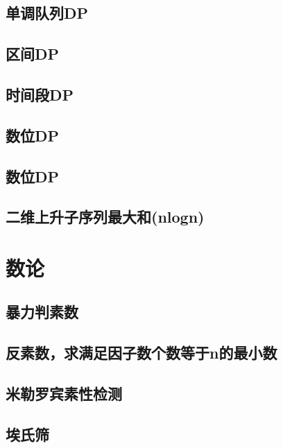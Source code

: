 \section{单调队列DP}
\raggedbottom
\hrulefill
\section{区间DP}
\raggedbottom
\hrulefill
\section{时间段DP}
\raggedbottom
\hrulefill
\section{数位DP}
\raggedbottom
\hrulefill
\section{数位DP}
\raggedbottom
\hrulefill
\section{二维上升子序列最大和(nlogn)}
\raggedbottom
\hrulefill

\chapter{数论}
\section{暴力判素数}
\raggedbottom
\hrulefill
\section{反素数，求满足因子数个数等于n的最小数}
\raggedbottom
\hrulefill
\section{米勒罗宾素性检测}
\raggedbottom
\hrulefill
\section{埃氏筛}
\raggedbottom
\hrulefill

